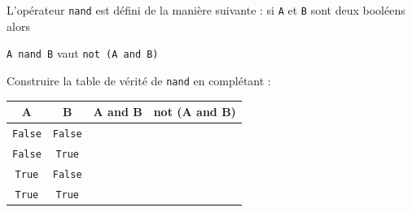 \begin{exercice}
	L'opérateur \texttt{nand} est défini de la manière suivante : si \texttt{A} et \texttt{B} sont deux booléens alors
	\begin{center}
		\texttt{A nand B} vaut \texttt{not (A and B)}
	\end{center}
	Construire la table de vérité de \texttt{nand} en complétant :
	\begin{center}
		\tabstyled
		\begin{tabular}{|c|c|c|c|}
			\hline
			\ccell A & \ccell B  & \ccell A and B & \ccell not (A and B) \\
			\hline
			\texttt{False}                     & \texttt{False} &                                 &                                       \\
			\hline
			\texttt{False}                     & \texttt{True}  &                                 &                                       \\
			\hline
			\texttt{True}                      & \texttt{False} &                                 &                                       \\
			\hline
			\texttt{True}                      & \texttt{True}  &                                 &                                       \\
			\hline
		\end{tabular}
	\end{center}
\end{exercice}


